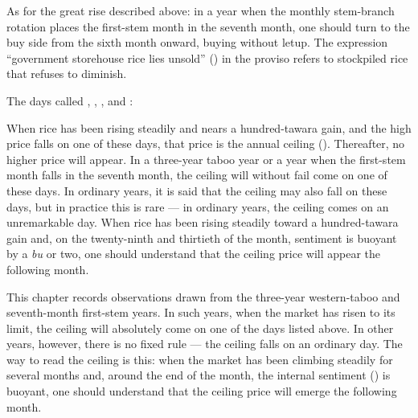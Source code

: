 As for the great rise described above: in a year when the monthly
stem-branch rotation places the first-stem month in the seventh
month, one should turn to the buy side from the sixth month onward,
buying without letup. The expression ``government storehouse rice
lies unsold'' () in the proviso refers to stockpiled rice
that refuses to diminish.


\begin{sokyubox}
{\small\itshape\color{sokyubar} }

\medskip
The days called ,
, ,
and :

When rice has been rising steadily and nears a hundred-tawara gain,
and the high price falls on one of these days, that price is the
annual ceiling (). Thereafter, no higher price will
appear. In a three-year taboo year or a year when the first-stem
month falls in the seventh month, the ceiling will without fail
come on one of these days. In ordinary years, it is said that the
ceiling may also fall on these days, but in practice this is rare
--- in ordinary years, the ceiling comes on an unremarkable day.
When rice has been rising steadily toward a hundred-tawara gain and,
on the twenty-ninth and thirtieth of the month, sentiment is
buoyant by a \textit{bu} or two, one should understand that the ceiling price
will appear the following month.
\end{sokyubox}

\commentary
This chapter records observations drawn from the three-year
western-taboo and seventh-month first-stem years. In such years,
when the market has risen to its limit, the ceiling will absolutely
come on one of the days listed above. In other years, however,
there is no fixed rule --- the ceiling falls on an ordinary day.
The way to read the ceiling is this: when the market has been
climbing steadily for several months and, around the end of the
month, the internal sentiment () is
buoyant, one should understand that the ceiling price will emerge the
following month.


